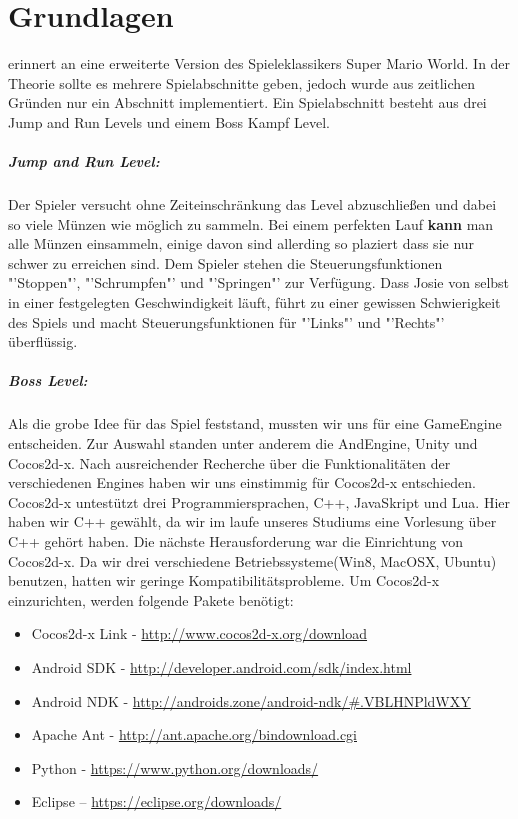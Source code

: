 \chapter{Grundlagen}\label{ch:grundl}



\gamename  erinnert an eine erweiterte Version des Spieleklassikers Super Mario World.
In der Theorie sollte es mehrere Spielabschnitte geben, jedoch wurde aus zeitlichen Gründen nur ein Abschnitt implementiert. Ein Spielabschnitt besteht aus drei Jump and Run Levels und einem Boss Kampf Level. 

\paragraph{Jump and Run Level:}
Der Spieler versucht ohne Zeiteinschränkung das Level abzuschließen und dabei so viele Münzen wie möglich zu sammeln. Bei einem perfekten Lauf \textbf{kann} man alle Münzen einsammeln, einige davon sind allerding so plaziert dass sie nur schwer zu erreichen sind.
Dem Spieler stehen die Steuerungsfunktionen "'Stoppen"', "'Schrumpfen"' und "'Springen"' zur Verfügung. 
Dass Josie von selbst in einer festgelegten Geschwindigkeit läuft, führt zu einer gewissen Schwierigkeit des Spiels und macht Steuerungsfunktionen für "'Links"' und "'Rechts"' überflüssig.

\paragraph{Boss Level:}



\label{sec:2_Framework}
Als die grobe Idee für das Spiel feststand, mussten wir uns für eine GameEngine entscheiden. Zur Auswahl standen unter anderem die AndEngine, Unity und Cocos2d-x. Nach ausreichender Recherche über die Funktionalitäten der verschiedenen Engines haben wir uns einstimmig für Cocos2d-x entschieden. Cocos2d-x untestützt drei Programmiersprachen, C++, JavaSkript und Lua. Hier haben wir C++ gewählt, da wir im laufe unseres Studiums eine Vorlesung über C++ gehört haben.
Die nächste Herausforderung war die Einrichtung von Cocos2d-x. Da wir drei verschiedene Betriebssysteme(Win8, MacOSX, Ubuntu) benutzen, hatten wir geringe Kompatibilitätsprobleme.
Um Cocos2d-x einzurichten, werden folgende Pakete benötigt:

\begin{itemize}
\item Cocos2d-x Link - \url{http://www.cocos2d-x.org/download}
\item Android SDK - \url{http://developer.android.com/sdk/index.html}
\item Android NDK - \url{http://androids.zone/android-ndk/#.VBLHNPldWXY}
\item Apache Ant - \url{http://ant.apache.org/bindownload.cgi}
\item Python - \url{https://www.python.org/downloads/}
\item Eclipse – \url{https://eclipse.org/downloads/}
\end{itemize}

